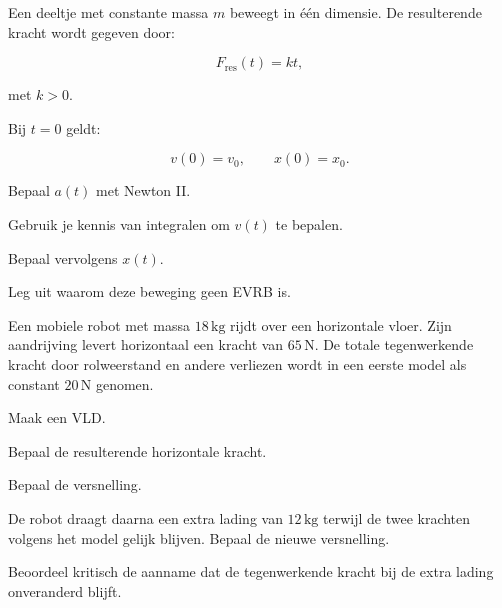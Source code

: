 \documentclass{ximera}
\begin{document}
\begin{oefening}{\oefG}

Een deeltje met constante massa $m$ beweegt in één dimensie. De
resulterende kracht wordt gegeven door:

\[
F_{\mathrm{res}}(t)=kt,
\]

met $k>0$.

Bij $t=0$ geldt:

\[
v(0)=v_0,
\qquad
x(0)=x_0.
\]

\begin{question}
Bepaal $a(t)$ met Newton II.
\end{question}

\begin{question}
Gebruik je kennis van integralen om $v(t)$ te bepalen.
\end{question}

\begin{question}
Bepaal vervolgens $x(t)$.
\end{question}

\begin{question}
Leg uit waarom deze beweging geen EVRB is.
\end{question}

\end{oefening}


\begin{oefening}{\oefG}

Een mobiele robot met massa $18\,\mathrm{kg}$ rijdt over een
horizontale vloer. Zijn aandrijving levert horizontaal een kracht van
$65\,\mathrm N$. De totale tegenwerkende kracht door rolweerstand en
andere verliezen wordt in een eerste model als constant
$20\,\mathrm N$ genomen.

\begin{question}
Maak een VLD.
\end{question}

\begin{question}
Bepaal de resulterende horizontale kracht.
\end{question}

\begin{question}
Bepaal de versnelling.
\end{question}

\begin{question}
De robot draagt daarna een extra lading van $12\,\mathrm{kg}$ terwijl
de twee krachten volgens het model gelijk blijven. Bepaal de nieuwe
versnelling.
\end{question}

\begin{question}
Beoordeel kritisch de aanname dat de tegenwerkende kracht bij de extra
lading onveranderd blijft.
\end{question}

\end{oefening}
\end{document}

